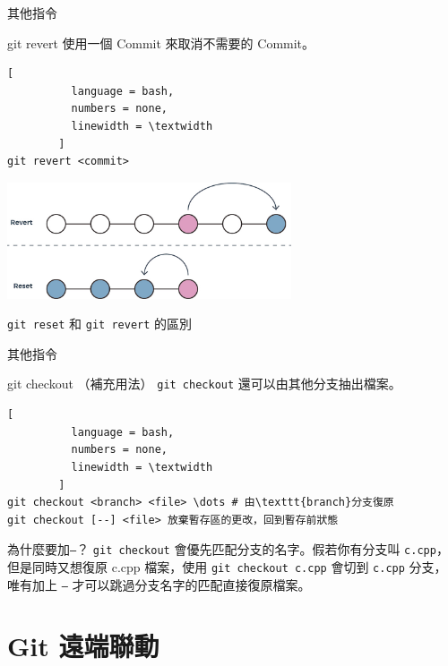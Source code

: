 \documentclass[xetex, unicode, 10pt, aspectratio=169]{beamer}
\begin{document}
\begin{frame}[fragile]{其他指令}
    \begin{block}{git revert}
        使用一個 Commit 來取消不需要的 Commit。
        \begin{lstlisting}[
          language = bash,
          numbers = none,
          linewidth = \textwidth
        ]
git revert <commit>\end{lstlisting}
        \begin{center}
            \includegraphics[width=3.3in]{./img/git-reset-vs-revert.jpg}

            \texttt{git reset} 和 \texttt{git revert} 的區別
        \end{center}
    \end{block}
\end{frame}

\begin{frame}[fragile]{其他指令}
    \begin{block}{git checkout （補充用法）}
        \texttt{git checkout} 還可以由其他分支抽出檔案。
        \begin{lstlisting}[
          language = bash,
          numbers = none,
          linewidth = \textwidth
        ]
git checkout <branch> <file> \dots # 由\texttt{branch}分支復原
git checkout [--] <file> 放棄暫存區的更改，回到暫存前狀態\end{lstlisting}
        \begin{block}{為什麼要加\texttt{--}？}
            \justify\hspace{18pt}\texttt{git checkout} 會優先匹配分支的名字。假若你有分支叫
            \texttt{c.cpp}，但是同時又想復原 c.cpp 檔案，使用 \texttt{git checkout c.cpp}
            會切到 \texttt{c.cpp} 分支，唯有加上 \texttt{--} 才可以跳過分支名字的匹配直接復原檔案。
        \end{block}
    \end{block}
\end{frame}

\section{Git 遠端聯動}
\end{document}
